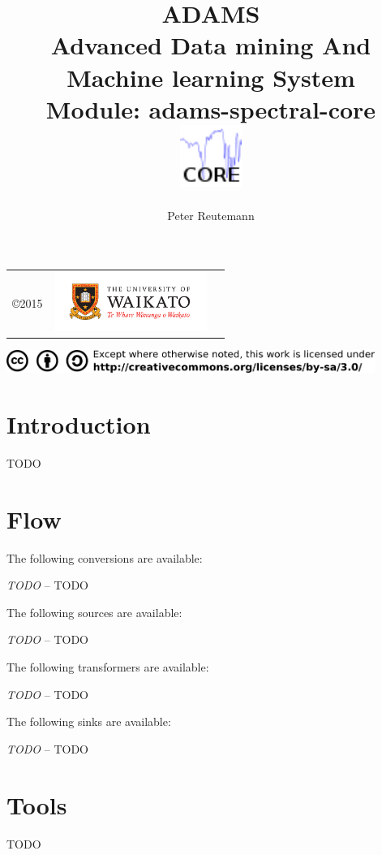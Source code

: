 \documentclass[a4paper]{book}
\title{
  \textbf{ADAMS} \\
  {\Large \textbf{A}dvanced \textbf{D}ata mining \textbf{A}nd \textbf{M}achine
  learning \textbf{S}ystem} \\
  {\Large Module: adams-spectral-core} \\
  \vspace{1cm}
  \includegraphics[width=2cm]{images/spectral-core-module.png} \\
}
\author{
  Peter Reutemann
}
\begin{document}
\begin{titlepage}
\maketitle

\thispagestyle{empty}
\center
\begin{table}[b]
	\begin{tabular}{c l l}
		\parbox[c][2cm]{2cm}{\copyright 2015} &
		\parbox[c][2cm]{5cm}{\includegraphics[width=5cm]{images/coat_of_arms.pdf}} \\
	\end{tabular}
	\includegraphics[width=12cm]{images/cc.png} \\
\end{table}

\end{titlepage}

\tableofcontents
\listoffigures

\chapter{Introduction}
TODO

\chapter{Flow}
The following conversions are available:
\begin{tight_itemize}
  	\item \textit{TODO} -- TODO
\end{tight_itemize}
The following sources are available:
\begin{tight_itemize}
  	\item \textit{TODO} -- TODO
\end{tight_itemize}
The following transformers are available:
\begin{tight_itemize}
  	\item \textit{TODO} -- TODO
\end{tight_itemize}
The following sinks are available:
\begin{tight_itemize}
  	\item \textit{TODO} -- TODO
\end{tight_itemize}

\chapter{Tools}
TODO


\end{document}
